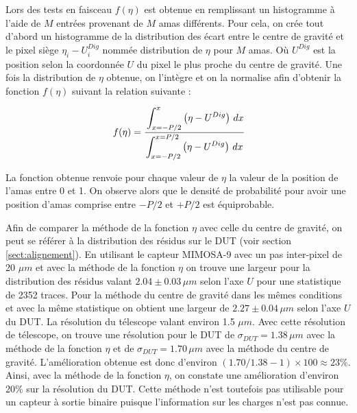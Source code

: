    Lors des tests en faisceau $f(\eta)$ est obtenue en remplissant un histogramme \`a l'aide de $M$ entr\'ees provenant de $M$ amas diff\'erents. Pour cela, on cr\'ee tout d'abord un histogramme de la distribution des \'ecart entre le centre de gravit\'e et le pixel si\`ege $\eta_i - U^{Dig}_i$ nomm\'ee distribution de $\eta$ pour $M$ amas. O\`u $U^{Dig}$ est la position selon la coordonn\'ee $U$ du pixel le plus proche du centre de gravit\'e. Une fois la distribution de $\eta$ obtenue, on l'int\`egre et on la normalise afin d'obtenir la fonction $f(\eta)$ suivant la relation suivante :
   
   \begin{equation}
    f(\eta) = \cfrac{ \displaystyle\int_{x=-P/2}^{x} \left( \eta - U^{Dig} \right) \, dx }{ \displaystyle\int_{x=-P/2}^{x=P/2} \left( \eta - U^{Dig} \right) \, dx }
   \end{equation}
   
   La fonction obtenue renvoie pour chaque valeur de $\eta$ la valeur de la position de l'amas entre 0 et 1. On observe alors que le densit\'e de probabilit\'e pour avoir une position d'amas comprise entre $-P/2$ et $+P/2$ est \'equiprobable.
   
   \medskip
   
   Afin de comparer la m\'ethode de la fonction $\eta$ avec celle du centre de gravit\'e, on peut se r\'ef\'erer \`a la distribution des r\'esidus sur le DUT (voir section \ref{sect:alignement}). En utilisant le capteur MIMOSA-9 avec un pas inter-pixel de 20 $\mu m$ et avec la m\'ethode de la fonction $\eta$ on trouve une largeur pour la distribution des r\'esidus valant $ 2.04 \pm 0.03 \, \mu m$ selon l'axe $U$ pour une statistique de 2352 traces. Pour la m\'ethode du centre de gravit\'e dans les mêmes conditions et avec la m\^eme statistique on obtient une largeur de $2.27 \pm 0.04 \, \mu m$ selon l'axe $U$ du DUT. La r\'esolution du t\'elescope valant environ 1.5 $\mu m$. Avec cette r\'esolution de t\'elescope, on trouve une r\'esolution pour le DUT de $\sigma_{DUT} = 1.38 \, \mu m$ avec la m\'ethode de la fonction $\eta$ et de $\sigma_{DUT} = 1.70 \, \mu m$ avec la m\'ethode du centre de gravit\'e. L'am\'elioration obtenue est donc d'environ $(1.70/1.38-1) \times 100 \approx 23 \%$. Ainsi, avec la m\'ethode de la fonction $\eta$, on constate une am\'elioration d'environ 20\% sur la r\'esolution du DUT. Cette m\'ethode n'est toutefois pas utilisable pour un capteur \`a sortie binaire puisque l'information sur les charges n'est pas connue.
  

